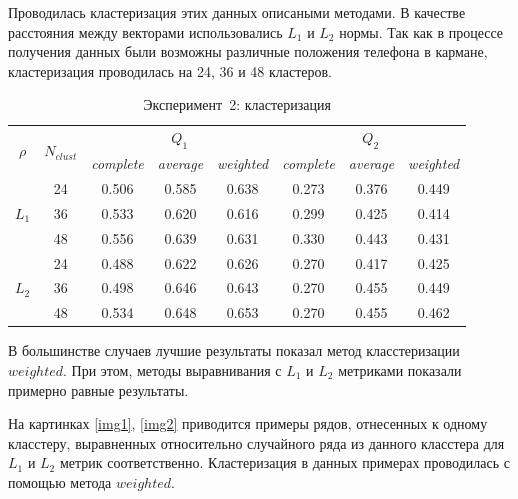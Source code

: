 \documentclass[12pt,twoside]{article}
\begin{document}
        Проводилась кластеризация этих данных описаными методами. В качестве расстояния между векторами использовались $L_1$  и $L_2$ нормы.
        Так как в процессе получения данных были возможны различные положения телефона в кармане, кластеризация проводилась на 24, 36 и 48 кластеров.

        \begin{table}[h]
            \centering
            \begin{tabular}{c|c *{2}{|*{3}{c}}}
                \toprule
                 &  &  &  \\
                \cmidrule(r){3-8}
                && \textit{complete} & \textit{average} & \textit{weighted} & \textit{complete} & \textit{average} & \textit{weighted} \\
                \midrule
                    & 24    &   0.506  &   0.585 &    0.638  & 0.273   &  0.376    &   0.449  \\
                    & 36    &   0.533  &   0.620 &    0.616  & 0.299   &  0.425    &   0.414  \\
                    & 48    &   0.556  &   0.639 &    0.631  & 0.330   &  0.443    &   0.431  \\
            \midrule
                    & 24    &   0.488  &   0.622 &    0.626  & 0.270   &  0.417    &   0.425  \\
                    & 36    &   0.498  &   0.646 &    0.643  & 0.270   &  0.455    &   0.449  \\
                    & 48    &   0.534  &   0.648 &    0.653  & 0.270   &  0.455    &   0.462  \\
            \bottomrule
            \end{tabular}
            \caption{Эксперимент~2: кластеризация}
        \end{table}

    В большинстве случаев лучшие результаты показал метод класстеризации $weighted$.
    При этом, методы выравнивания с $L_1$ и $L_2$ метриками показали примерно равные результаты.
						
    На картинках \ref{img1}, \ref{img2} приводится примеры рядов, отнесенных к одному класстеру,
        выравненных относительно случайного ряда из данного класстера для $L_1$ и $L_2$ метрик соответственно.
    Кластеризация в данных примерах проводилась с помощью метода $weighted$.
\end{document}
